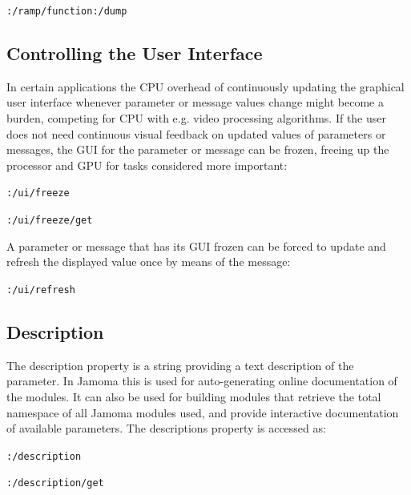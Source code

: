 \documentclass{NIME-alternate}
\begin{document}
\begin{Abstract}
\texttt{:/ramp/function:/dump}





\subsection{Controlling the User Interface} %
\label{sub:controlling_the_user_interface}

In certain applications the CPU overhead of continuously updating the graphical user interface whenever parameter or message values change might become a burden, competing for CPU with e.g. video processing algorithms. If the user does not need continuous visual feedback on updated values of parameters or messages, the GUI for the parameter or message can be frozen, freeing up the processor and GPU for tasks considered more important:

\texttt{:/ui/freeze}

\texttt{:/ui/freeze/get}

A parameter or message that has its GUI frozen can be forced to update and refresh the displayed value once by means of the message:

\texttt{:/ui/refresh}






\subsection{Description} %
\label{sub:description}

The description property is a string providing a text description of the parameter. In Jamoma this is used for auto-generating online documentation of the modules. It can also be used for building modules that retrieve the total namespace of all Jamoma modules used, and provide interactive documentation of available parameters. The descriptions property is accessed as:

\texttt{:/description}

\texttt{:/description/get}







\end{Abstract}
\end{document}
